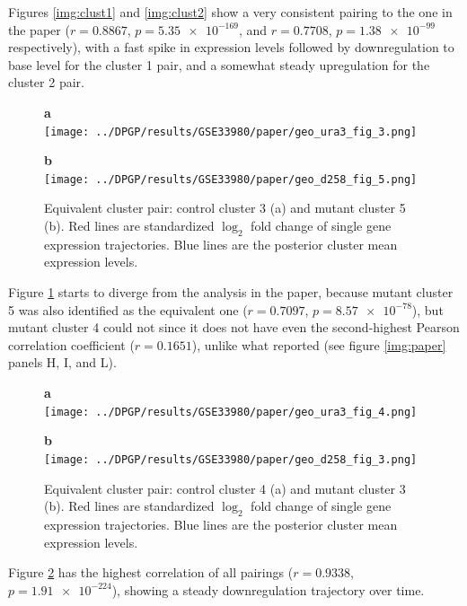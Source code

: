 Figures \ref{img:clust1} and \ref{img:clust2} show a very consistent pairing to the one in the paper ($r=\num{0.8867}$, $p=\num{5.35e-169}$, and $r=\num{0.7708}$, $p=\num{1.38e-99}$ respectively), with a fast spike in expression levels followed by downregulation to base level for the cluster 1 pair, and a somewhat steady upregulation for the cluster 2 pair.

\begin{figure}[!ht]
    \centering
    \parbox{.4\textwidth}{
        \textbf{a}\\
        \texttt{[image: ../DPGP/results/GSE33980/paper/geo\_ura3\_fig\_3.png]}
    }
    \parbox{.4\textwidth}{
        \textbf{b}\\
        \texttt{[image: ../DPGP/results/GSE33980/paper/geo\_d258\_fig\_5.png]}
    }
    \caption[Equivalent cluster 3 pair]{Equivalent cluster pair: control cluster 3 (a) and mutant cluster 5 (b). Red lines are standardized $\log_{2}$ fold change of single gene expression trajectories. Blue lines are the posterior cluster mean expression levels.}\label{img:clust3}
\end{figure}

Figure \ref{img:clust3} starts to diverge from the analysis in the paper, because mutant cluster 5 was also identified as the equivalent one ($r=\num{0.7097}$, $p=\num{8.57e-78}$), but mutant cluster 4 could not since it does not have even the second-highest Pearson correlation coefficient ($r=\num{0.1651}$), unlike what \citeauthor{mcdowellClusteringGeneExpression2018} reported (see figure \ref{img:paper} panels H, I, and L).

\begin{figure}[!ht]
    \centering
    \parbox{.4\textwidth}{
        \textbf{a}\\
        \texttt{[image: ../DPGP/results/GSE33980/paper/geo\_ura3\_fig\_4.png]}
    }
    \parbox{.4\textwidth}{
        \textbf{b}\\
        \texttt{[image: ../DPGP/results/GSE33980/paper/geo\_d258\_fig\_3.png]}
    }
    \caption[Equivalent cluster 4 pair]{Equivalent cluster pair: control cluster 4 (a) and mutant cluster 3 (b). Red lines are standardized $\log_{2}$ fold change of single gene expression trajectories. Blue lines are the posterior cluster mean expression levels.}\label{img:clust4}
\end{figure}

Figure \ref{img:clust4} has the highest correlation of all pairings ($r=\num{0.9338}$, $p=\num{1.91e-224}$), showing a steady downregulation trajectory over time.


